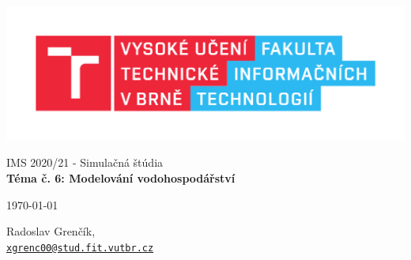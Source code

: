 \documentclass[a4paper, 11pt]{article}
\begin{document}
\begin{titlepage}
	\begin{center}
		\includegraphics[width=0.77 \linewidth]{FIT_logo.pdf}


		\huge{IMS 2020/21 - Simulačná štúdia} \\
		\LARGE{\textbf{Téma č. 6: Modelování vodohospodářství}}

	\end{center}
	\begin{minipage}{0.25 \textwidth}
		\begin{flushleft}
			\Large
			\today
		\end{flushleft}
	\end{minipage}
	\hfill
	\begin{minipage}{0.65 \textwidth}
		\begin{flushright}
			\Large
			Radoslav Grenčík, \\
			\large
			\texttt{\href{mailto:xgrenc00@stud.fit.vutbr.cz}{xgrenc00@stud.fit.vutbr.cz}}
		\end{flushright}
	\end{minipage}
\end{titlepage}

\clearpage
\thispagestyle{empty}
\tableofcontents

\clearpage
{}
\setcounter{page}{3}
\end{document}
